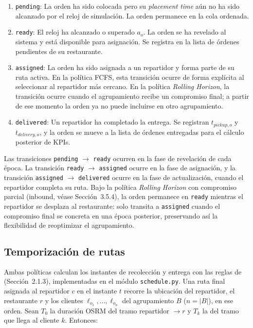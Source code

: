 \documentclass[12pt,letterpaper,oneside]{book}
\begin{document}
	\begin{enumerate}
		\item \texttt{pending}: La orden ha sido colocada pero su \textit{placement time} aún no 
		ha sido alcanzado por el reloj de simulación. La orden permanece en la cola ordenada.

		\item \texttt{ready}: El reloj ha alcanzado o superado $a_o$. La orden se ha revelado 
		al sistema y está disponible para asignación. Se registra en la lista de órdenes 
		pendientes de su restaurante.

		\item \texttt{assigned}: La orden ha sido asignada a un repartidor y forma parte de su
		ruta activa. En la política FCFS, esta transición ocurre de forma explícita al
		seleccionar al repartidor más cercano. En la política \textit{Rolling Horizon}, la transición
		ocurre cuando el agrupamiento recibe un compromiso final; a partir de ese momento la
		orden ya no puede incluirse en otro agrupamiento.

		\item \texttt{delivered}: Un repartidor ha completado la entrega. Se registran 
		$t_{pickup,o}$ y $t_{delivery,o}$, y la orden se mueve a la lista de órdenes entregadas 
		para el cálculo posterior de KPIs.
	\end{enumerate}

	Las transiciones \texttt{pending} $\to$ \texttt{ready} ocurren en la fase de revelación
	de cada época. La transición \texttt{ready} $\to$ \texttt{assigned} ocurre en la fase de
	asignación, y la transición \texttt{assigned} $\to$ \texttt{delivered} ocurre en la fase de
	actualización, cuando el repartidor completa su ruta.  Bajo la política \textit{Rolling Horizon}
	con compromiso parcial (inbound, véase Sección~3.5.4), la orden permanece en
	\texttt{ready} mientras el repartidor se desplaza al restaurante: solo transita a
	\texttt{assigned} cuando el compromiso final se concreta en una época posterior,
	preservando así la flexibilidad de reoptimizar el agrupamiento.

	\subsection{Temporización de rutas}
	\label{sec:temporizacion}

	Ambas políticas calculan los instantes de recolección y entrega con las reglas de
	\citet{Reyes2018} (Sección~2.1.3), implementadas en el módulo \texttt{schedule.py}.  Una ruta
	final asignada al repartidor $c$ en el instante $t$ recorre la ubicación del repartidor, el
	restaurante $r$ y los clientes $\ell_{o_1}, \ldots, \ell_{o_n}$ del agrupamiento $B$
	($n = |B|$), en ese orden.  Sean $T_0$ la duración
	OSRM del tramo repartidor $\to r$ y $T_k$ la del tramo que llega al cliente $k$.  Entonces:
\end{document}
